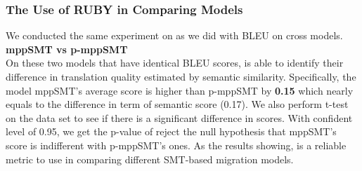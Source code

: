 \subsubsection{The Use of RUBY in Comparing Models}
We conducted the same experiment on {\model} as we did with BLEU on cross models. 
\textbf{mppSMT vs p-mppSMT}\\
On these two models that have identical BLEU scores, {\model} is able to identify their difference in translation quality estimated by semantic similarity. Specifically, the model mppSMT's average {\model} score is higher than p-mppSMT by \textbf{0.15} which nearly equals to the difference in term of semantic score (0.17). We also perform t-test on the data set to see if there is a significant difference in {\model} scores. With confident level of 0.95, we get the p-value of reject the null hypothesis that mppSMT's {\model} score is indifferent with p-mppSMT's ones.  
As the results showing, {\model} is a reliable metric to use in comparing different SMT-based migration models. 	